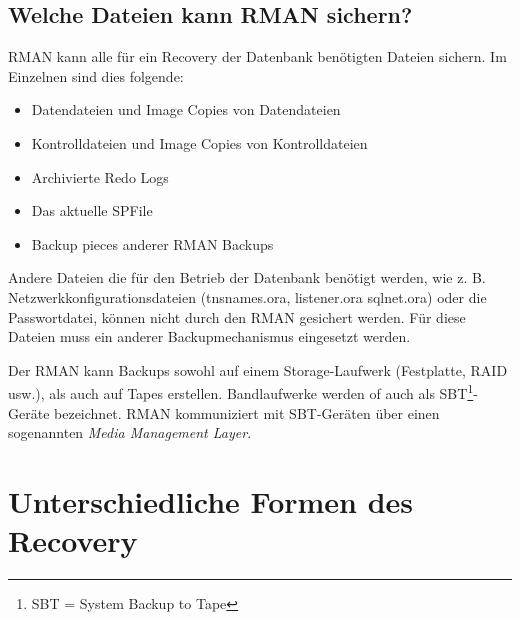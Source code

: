       \subsection{Welche Dateien kann RMAN sichern?}
        RMAN kann alle für ein Recovery der Datenbank benötigten Dateien sichern. Im Einzelnen sind dies folgende:
        \begin{itemize}
          \item Datendateien und Image Copies von Datendateien
          \item Kontrolldateien und Image Copies von Kontrolldateien
          \item Archivierte Redo Logs
          \item Das aktuelle SPFile
          \item Backup pieces anderer RMAN Backups
        \end{itemize}
        Andere Dateien die für den Betrieb der Datenbank benötigt werden, wie z. B. Netzwerkkonfigurationsdateien (tnsnames.ora, listener.ora sqlnet.ora) oder die Passwortdatei, können nicht durch den RMAN gesichert werden. Für diese Dateien muss ein anderer Backupmechanismus eingesetzt werden.

        Der RMAN kann Backups sowohl auf einem Storage-Laufwerk (Festplatte, RAID usw.), als auch auf Tapes erstellen. Bandlaufwerke werden of auch als SBT\footnote{SBT = System Backup to Tape}-Geräte bezeichnet. RMAN kommuniziert mit SBT-Geräten über einen sogenannten \textit{Media Management Layer}.
    \section{Unterschiedliche Formen des Recovery}

